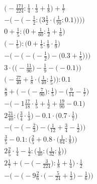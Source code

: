\documentclass[8pt]{article}
\begin{document}
\begin{align}
\big(-\frac{171}{224} : \frac{1}{4} \cdot \frac{1}{3} + \frac{1}{8}\big) + \frac{1}{7} \\
-\Bigg(-\bigg(-\frac{1}{2} : \Big(3\frac{1}{2} \cdot \big(\frac{1}{70} : 0.1\big)\Big)\bigg)\Bigg) \\
0 + \frac{1}{5} : \big(0 + \frac{1}{60} : \frac{1}{2} + \frac{1}{6}\big) \\
\big(-\frac{1}{5}\big) : \big(0 + \frac{1}{5} : \frac{1}{9} \cdot \frac{1}{9}\big) \\
-\bigg(-\Big(-\big(-\frac{1}{2}\big) - \big(0.3 + \frac{1}{5}\big)\Big)\bigg) \\
3 \cdot \Big(\big(-\frac{11}{90}\big) - \frac{1}{9} - \big(-0.1\big)\Big) \\
\Big(-\frac{27}{40} + \frac{1}{8} \cdot \big(\frac{1}{40} : \frac{1}{5}\big)\Big) : 0.1 \\
\frac{8}{9} + \Big(-\big(-\frac{7}{90}\big) : \frac{1}{5}\Big) - \Big(\frac{9}{14} - \frac{1}{7}\Big) \\
-\big(-1\frac{17}{18} \cdot \frac{1}{5} + \frac{1}{2} + \frac{19}{90} - 0.1\big) \\
2\frac{21}{40} : \big(\frac{3}{4} \cdot \frac{1}{3}\big) - 0.1 \cdot \big(0.7 \cdot \frac{1}{7}\big) \\
-\Big(-\big(-\frac{2}{3}\big) - \big(\frac{1}{12} + \frac{3}{4} - \frac{1}{2}\big)\Big) \\
\frac{3}{5} - 0.1 : \Big(\frac{2}{5} + 0.8 \cdot \big(\frac{1}{64} : \frac{1}{8}\big)\Big) \\
2\frac{2}{5} \cdot \frac{1}{4} - \frac{1}{2} : \Big(\frac{1}{40} : \big(\frac{1}{32} : \frac{1}{8}\big)\Big) \\
2\frac{1}{7} + \Big(-\big(-\frac{3}{224}\big) : \frac{1}{8} + \frac{1}{4}\Big) \cdot \frac{1}{2} \\
-\bigg(-\Big(-9\frac{2}{6} \cdot \big(-\frac{5}{24} + \frac{1}{3}\big) - \frac{1}{6}\Big)\bigg)
\end{align}
\end{document}

